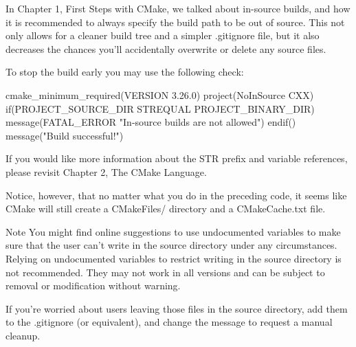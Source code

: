 
In Chapter 1, First Steps with CMake, we talked about in-source builds, and how it is recommended to always specify the build path to be out of source. This not only allows for a cleaner build tree and a simpler .gitignore file, but it also decreases the chances you’ll accidentally overwrite or delete any source files.

To stop the build early you may use the following check:


\begin{cmake}
cmake_minimum_required(VERSION 3.26.0)
project(NoInSource CXX)
if(PROJECT_SOURCE_DIR STREQUAL PROJECT_BINARY_DIR)
    message(FATAL_ERROR "In-source builds are not allowed")
endif()
message("Build successful!")
\end{cmake}

If you would like more information about the STR prefix and variable references, please revisit Chapter 2, The CMake Language.

Notice, however, that no matter what you do in the preceding code, it seems like CMake will still create a CMakeFiles/ directory and a CMakeCache.txt file.

\begin{myNotic}{Note}
You might find online suggestions to use undocumented variables to make sure that the user can’t write in the source directory under any circumstances. Relying on undocumented variables to restrict writing in the source directory is not recommended. They may not work in all versions and can be subject to removal or modification without warning.
\end{myNotic}

If you’re worried about users leaving those files in the source directory, add them to the .gitignore (or equivalent), and change the message to request a manual cleanup.
































